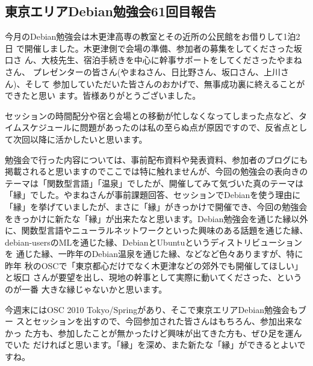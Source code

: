 \documentclass[mingoth,a4paper]{jsarticle}
\begin{document}
\subsection{東京エリアDebian勉強会61回目報告}

今月のDebian勉強会は木更津高専の教室とその近所の公民館をお借りして1泊2日
で開催しました。木更津側で会場の準備、参加者の募集をしてくださった坂口さ
ん、大枝先生、宿泊手続きを中心に幹事サポートをしてくださったやまねさん、
プレゼンターの皆さん(やまねさん、日比野さん、坂口さん、上川さん)、そして
参加していただいた皆さんのおかげで、無事成功裏に終えることができたと思い
ます。皆様ありがとうございました。 

セッションの時間配分や宿と会場との移動が忙しなくなってしまった点など、タ
イムスケジュールに問題があったのは私の至らぬ点が原因ですので、反省点とし
て次回以降に活かしたいと思います。 

勉強会で行った内容については、事前配布資料や発表資料、参加者のブログにも
掲載されると思いますのでここでは特に触れませんが、今回の勉強会の表向きの
テーマは「関数型言語」「温泉」でしたが、開催してみて気づいた真のテーマは
「縁」でした。やまねさんが事前課題回答、セッションでDebianを使う理由に
「縁」を挙げていましたが、まさに「縁」がきっかけで開催でき、今回の勉強会
をきっかけに新たな「縁」が出来たなと思います。Debian勉強会を通じた縁以外
に、関数型言語やニューラルネットワークといった興味のある話題を通じた縁、
debian-usersのMLを通じた縁、DebianとUbuntuというディストリビューションを
通じた縁、一昨年のDebian温泉を通じた縁、などなど色々ありますが、特に昨年
秋のOSCで「東京都心だけでなく木更津などの郊外でも開催してほしい」と坂口
さんが要望を出し、現地の幹事として実際に動いてくださった、というのが一番
大きな縁じゃないかと思います。 

今週末にはOSC 2010 Tokyo/Springがあり、そこで東京エリアDebian勉強会もブー
スとセッションを出すので、今回参加された皆さんはもちろん、参加出来なかっ
た方も、参加したことが無かったけど興味が出てきた方も、ぜひ足を運んでいた
だければと思います。「縁」を深め、また新たな「縁」ができるとよいですね。


\end{document}
